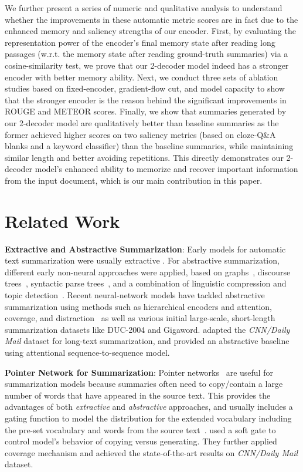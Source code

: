 \documentclass[11pt,a4paper]{article}
\begin{document}
We further present a series of numeric and qualitative analysis to understand whether the improvements in these automatic metric scores are in fact due to the enhanced memory and saliency strengths of our encoder. 
First, by evaluating the representation power of the encoder's final memory state after reading long passages (w.r.t. the memory state after reading ground-truth summaries) via a cosine-similarity test, we prove that our 2-decoder model indeed has a stronger encoder with better memory ability.
Next, we conduct three sets of ablation studies based on fixed-encoder, gradient-flow cut, and model capacity to show that the stronger encoder is the reason behind the significant improvements in ROUGE and METEOR scores.
Finally, we show that summaries generated by our 2-decoder model are qualitatively better than baseline summaries as the former achieved higher scores on two saliency metrics (based on cloze-Q\&A blanks and a keyword classifier) than the baseline summaries, while maintaining similar length and better avoiding repetitions. This directly demonstrates our 2-decoder model's enhanced ability to memorize and recover important information from the input document, which is our main contribution in this paper.

 \section{Related Work}

\noindent\textbf{Extractive and Abstractive Summarization}:
Early models for automatic text summarization were usually extractive \cite{Jing:00,Knight:02,Clarke:08,Filippova:15}.
For abstractive summarization, different early non-neural approaches were applied, based on graphs~\cite{Giannakopoulos:09,Ganesan:10}, discourse trees~\cite{Gerani:14}, syntactic parse trees~\cite{Cheung:14,Wang:16}, and a combination of linguistic compression and topic detection~\cite{Zajic:04}.
Recent neural-network models have tackled abstractive summarization using methods such as hierarchical encoders and attention, coverage, and distraction~\cite{Rush:15,Chopra:16,Nallapati:16,Chen2016DistractionBasedNN,Takase:16} as well as various initial large-scale, short-length summarization datasets like DUC-2004 and Gigaword.
 adapted the \emph{CNN/Daily Mail} \cite{Hermann:15} dataset for long-text summarization, and provided an abstractive baseline using attentional sequence-to-sequence model. 

\noindent\textbf{Pointer Network for Summarization}:
Pointer networks~\cite{Vinyals:15} are useful for summarization models because summaries often need to copy/contain a large number of words that have appeared in the source text. This provides the advantages of both \emph{extractive} and \emph{abstractive} approaches, and usually includes a gating function to model the distribution for the extended vocabulary including the pre-set vocabulary and words from the source text~\cite{Zeng:16,Nallapati:16,Gu:16,Gulcehre:16,Miao:16}.
 used a soft gate to control model's behavior of copying versus generating. 
They further applied coverage mechanism and achieved the state-of-the-art results on \emph{CNN/Daily Mail} dataset. 
\end{document}
